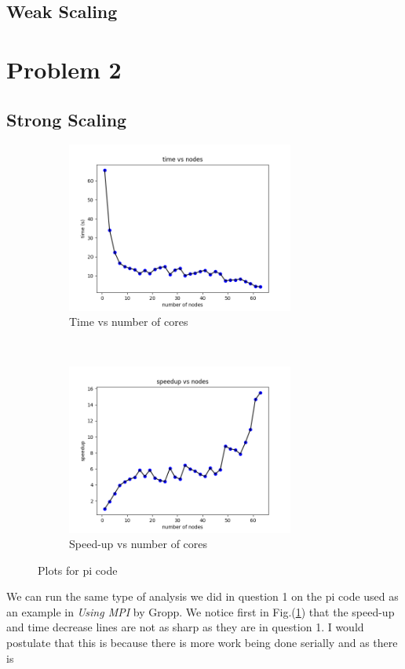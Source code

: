 \documentclass[12pt]{article}
\theoremstyle{plain}
\theoremstyle{definition}
\begin{document}
\subsection{Weak Scaling}



\section{Problem 2}
\subsection{Strong Scaling}
\begin{figure}[t]
    \centering
    \begin{subfigure}[t]{0.5\textwidth}
        \centering
        \includegraphics[height=2.2in]{timeq2_strong.png}
         \caption{Time vs number of cores}
    \end{subfigure}%
    ~
    \begin{subfigure}[t]{0.5\textwidth}
        \centering
        \includegraphics[height=2.2in]{speedupq2_strong.png}
        \caption{Speed-up vs number of cores}
    \end{subfigure}
    \caption{Plots for pi code}
    \label{fig:q2a}
\end{figure}

We can run the same type of analysis we did in question 1 on the pi code used as an example in \textit{Using MPI} by Gropp. We notice first in Fig.(\ref{fig:q2a}) that the speed-up and time decrease lines are not as sharp as they are in question 1. I would postulate that this is because there is more work being done serially and as there is 
\end{document}
